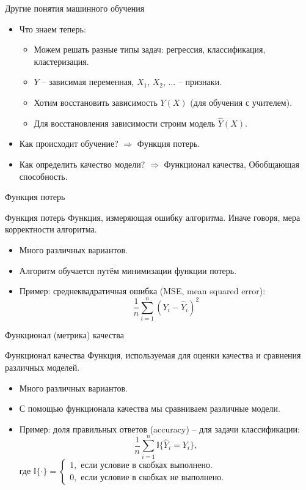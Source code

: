\documentclass[c, handout]{beamer} %
\begin{document}
\begin{frame}{Другие понятия машинного обучения}
	\begin{itemize}\setlength\itemsep{1em}
		\item<1-> Что знаем теперь:
		\begin{itemize}
			\item Можем решать разные типы задач: регрессия, классификация, кластеризация. 
			\item $Y$ – зависимая переменная, $X_1$, $X_2$, $\ldots$ – признаки.
			\item Хотим восстановить зависимость $Y(X)$ (для обучения с учителем).
			\item Для восстановления зависимости строим модель $\hat{Y}(X)$.
		\end{itemize}
		\item<2-> Как происходит обучение? $\Rightarrow$ Функция потерь.
		\item<2-> Как определить качество модели? $\Rightarrow$ Функционал качества, Обобщающая способность.
	\end{itemize}
\end{frame}

\begin{frame}{Функция потерь}
	\begin{block}{Функция потерь}
		Функция, измеряющая ошибку алгоритма. Иначе говоря, мера корректности алгоритма. 
	\end{block}
	\begin{itemize}
		\item Много различных вариантов.
		\item Алгоритм \alert{обучается путём минимизации функции потерь}. 
		\item Пример: среднеквадратичная ошибка (MSE, mean squared error):
		\[
		\dfrac{1}{n} \sum_{i=1}^{n}\left( Y_i - \hat{Y}_i  \right)^2 
		\]
	\end{itemize}
\end{frame}

\begin{frame}{Функционал (метрика) качества}
	\begin{block}{Функционал качества}
		Функция, используемая для оценки качества и сравнения различных моделей.
	\end{block}
	\begin{itemize}
		\item Много различных вариантов.
		\item С помощью функционала качества \alert{мы сравниваем различные модели}. 
		\item Пример: доля правильных ответов (accuracy) – для задачи классификации:
		\[
		\dfrac{1}{n}\sum_{i=1}^{n}\mathbb{I}\{\hat{Y}_i = Y_i\},
		\]
		где $\mathbb{I}\{\cdot\} = \begin{cases}
		1, \text{ если условие в скобках выполнено.} \\
		0, \text{ если условие в скобках не выполнено.}
		\end{cases}$
	\end{itemize}
\end{frame}
\end{document}
